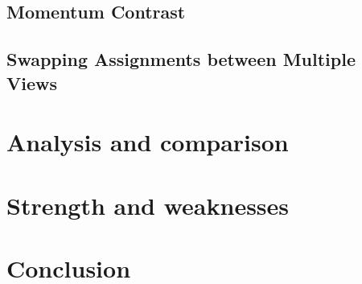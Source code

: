 \documentclass[12pt]{article}
\begin{document}
	\subsection*{Momentum Contrast}
	
	
	\subsection*{Swapping Assignments between Multiple Views}
	
	
	
	\section{Analysis and comparison}
	
	
	
	\section{Strength and weaknesses}
	\section{Conclusion}
	
	\newpage
	
	
	

	
	
	
\end{document}
